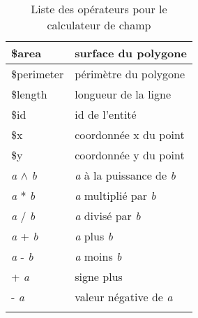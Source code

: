 \begin{center}
{\begin{longtable}{|p{4cm}|p{10cm}|}
\hline \$area & surface du polygone \\
\hline \$perimeter & périmètre du polygone \\
\hline \$length & longueur de la ligne \\
\hline \$id & id de l'entité \\
\hline \$x & coordonnée x du point \\
\hline \$y & coordonnée y du point \\
\hline \textit{a} $\wedge$ \textit{b} & \textit{a} à la puissance de \textit{b} \\
\hline \textit{a} * \textit{b} & \textit{a} multiplié par \textit{b} \\
\hline \textit{a} / \textit{b} & \textit{a} divisé par \textit{b} \\
\hline \textit{a} + \textit{b} & \textit{a} plus \textit{b} \\
\hline \textit{a} - \textit{b} & \textit{a} moins \textit{b} \\
\hline + \textit{a} & signe plus \\
\hline - \textit{a} & valeur négative de \textit{a} \\
\hline 
\caption{Liste des opérateurs pour le calculateur de champ}\\
\end{longtable}}
\end{center}

\FloatBarrier
